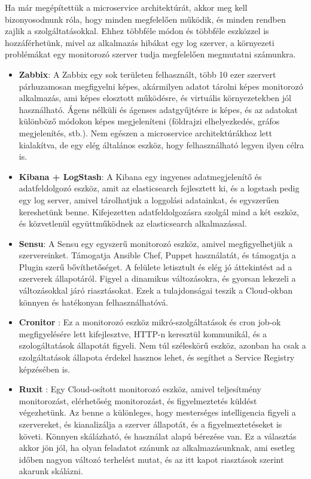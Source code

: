 \documentclass[11pt,magyar,a4paper,oneside,]{report}
\begin{document}
Ha már megépítettük a microservice architektúrát, akkor meg kell
bizonyosodnunk róla, hogy minden megfelelően működik, és minden rendben
zajlik a szolgáltatásokkal. Ehhez többféle módon és többféle eszközzel
is hozzáférhetünk, mivel az alkalmazás hibákat egy log szerver, a
környezeti problémákat egy monitorozó szerver tudja megfelelően
megmutatni számunkra.

\begin{itemize}
\item
  \textbf{Zabbix}\citep{zabbix}: A Zabbix egy sok területen felhasznált,
  több 10 ezer szervert párhuzamosan megfigyelni képes, akármilyen
  adatot tárolni képes monitorozó alkalmazás, ami képes elosztott
  működésre, és virtuális környezetekben jól használható. Ágens nélküli
  és ágenses adatgyűjtésre is képes, és az adatokat különböző módokon
  képes megjeleníteni (földrajzi elhelyezkedés, gráfos megjelenítés,
  stb.). Nem egészen a microservice architektúrákhoz lett kialakítva, de
  egy elég általános eszköz, hogy felhasználható legyen ilyen célra is.
\item
  \textbf{Kibana\citep{kibana} + LogStash}\citep{logstash}: A Kibana egy
  ingyenes adatmegjelenítő és adatfeldolgozó eszköz, amit az
  elasticsearch fejlesztett ki, és a logstash pedig egy log server,
  amivel tárolhatjuk a loggolási adatainkat, és egyszerűen kereshetünk
  benne. Kifejezetten adatfeldolgozásra szolgál mind a két eszköz, és
  közvetlenül együttműködnek az elasticsearch alkalmazással.
\item
  \textbf{Sensu}\citep{sensu}: A Sensu egy egyszerű monitorozó eszköz,
  amivel megfigyelhetjük a szervereinket. Támogatja Ansible Chef, Puppet
  használatát, és támogatja a Plugin szerű bővíthetőséget. A felülete
  letisztult és elég jó áttekintést ad a szerverek állapotáról. Figyel a
  dinamikus változásokra, és gyorsan lekezeli a változásokkal járó
  riasztásokat. Ezek a tulajdonságai teszik a Cloud-okban könnyen és
  hatékonyan felhasználhatóvá.
\item
  \textbf{Cronitor}\citep{cronitor} \citep{cron-monitoring}: Ez a
  monitorozó eszköz mikró-szolgáltatások és cron job-ok megfigyelésére
  lett kifejlesztve, HTTP-n keresztül kommunikál, és a szologáltatások
  állapotát figyeli. Nem túl széleskörű eszköz, azonban ha csak a
  szolgáltatások állapota érdekel hasznos lehet, és segíthet a Service
  Registry képzésében is.
\item
  \textbf{Ruxit}\citep{ruxit} \citep{ruxit-monitoring}: Egy
  Cloud-osított monitorozó eszköz, amivel teljesítmény monitorozást,
  elérhetőség monitorozást, és figyelmeztetés küldést végezhetünk. Az
  benne a különleges, hogy mesterséges intelligencia figyeli a
  szervereket, és kianalizálja a szerver állapotát, és a
  figyelmeztetéseket is követi. Könnyen skálázható, és használat alapú
  bérezése van. Ez a választás akkor jön jól, ha olyan feladatot szánunk
  az alkalmazásunknak, ami esetleg időben nagyon változó terhelést
  mutat, és az itt kapot riasztások szerint akarunk skálázni.
\end{itemize}
\end{document}
